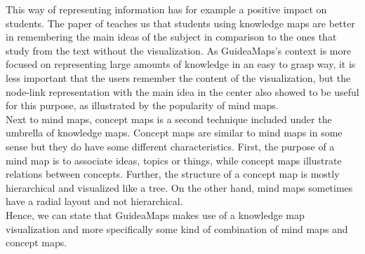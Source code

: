 This way of representing information has for example a positive impact on students. The paper of \cite{knowledgemapsodonnell} teaches us that students using knowledge maps are better in remembering the main ideas of the subject in comparison to the ones that study from the text without the visualization. As GuideaMaps's context is more focused on representing large amounts of knowledge in an easy to grasp way, it is less important that the users remember the content of the visualization, but the node-link representation with the main idea in the center also showed to be useful for this purpose, as illustrated by the popularity of mind maps.\\

Next to mind maps, concept maps is a second technique included under the umbrella of knowledge maps. Concept maps are similar to mind maps in some sense but they do have some different characteristics. First, the purpose of a mind map is to associate ideas, topics or things, while concept maps illustrate relations between concepts. Further, the structure of a concept map is mostly hierarchical and visualized like a tree. On the other hand, mind maps sometimes have a radial layout and not hierarchical. \citep{davies} \\

Hence, we can state that GuideaMaps makes use of a knowledge map visualization and more specifically some kind of combination of mind maps and concept maps.